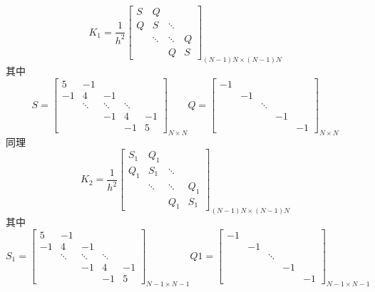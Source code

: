 \documentclass{article}
\begin{document}
\begin{equation*}
K_1=\frac{1}{h^2}	\begin{bmatrix}
		S& Q &  & \\ 
		Q& S & \ddots & \\ 
		& \ddots &\ddots  &Q \\ 
		&  & Q & S
	\end{bmatrix}_{(N-1)N\times (N-1)N}
\end{equation*}
其中
\begin{equation*}
	S=\begin{bmatrix}
		5 &  -1&  &  & \\ 
		-1&  4&-1  &  & \\ 
		&\ddots & \ddots &\ddots  & \\ 
		&  & -1& 4 &-1 \\ 
		&  &  &  -1& 5
	\end{bmatrix}_{N\times N}Q=\begin{bmatrix}
	-1&  &  &  & \\ 
	&  -1&  &  & \\ 
	& & \ddots &  & \\ 
	&  & & -1 & \\ 
	&  &  &  & -1
\end{bmatrix}_{N\times N}
\end{equation*}
同理
\begin{equation*}
	K_2=\frac{1}{h^2}	\begin{bmatrix}
		S_1& Q_1 &  & \\ 
		Q_1& S_1 & \ddots & \\ 
		& \ddots &\ddots  &Q_1 \\ 
		&  & Q_1 & S_1
	\end{bmatrix}_{(N-1)N\times (N-1)N}
\end{equation*}
其中
\begin{equation*}
	S_1=\begin{bmatrix}
		5 &  -1&  &  & \\ 
		-1&  4&-1  &  & \\ 
		&\ddots & \ddots &\ddots  & \\ 
		&  & -1& 4 &-1 \\ 
		&  &  &  -1& 5
	\end{bmatrix}_{N-1\times N-1}	Q1=\begin{bmatrix}
	-1&  &  &  & \\ 
	&  -1&  &  & \\ 
	& & \ddots &  & \\ 
	&  & & -1 & \\ 
	&  &  &  & -1
\end{bmatrix}_{N-1\times N-1}
\end{equation*}
\end{document}
